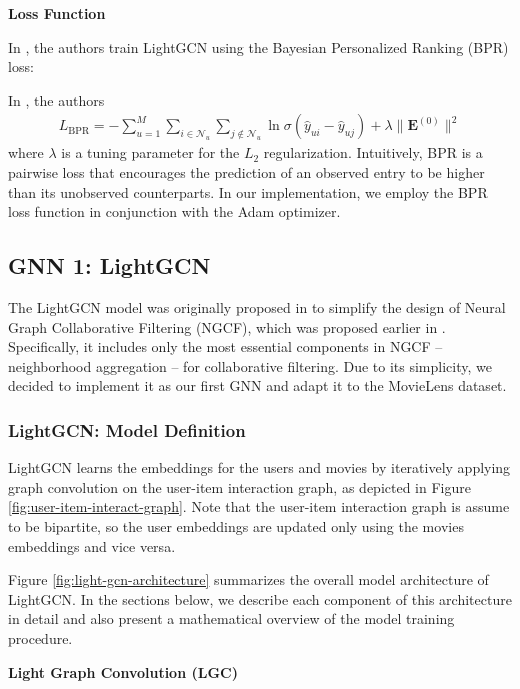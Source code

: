 \documentclass{article}
\begin{document}
\textbf{Loss Function}

In \cite{lightgcn}, the authors train LightGCN using the Bayesian Personalized Ranking (BPR) loss:

In \cite{lightgcn}, the authors 
\begin{align*}
    L_{\mbox{BPR}} = - \sum_{u = 1}^M \sum_{i \in \mathcal{N}_u} \sum_{j \notin \mathcal{N}_u} \ln \sigma(\hat{y}_{ui} - \hat{y}_{uj}) + \lambda \| \mathbf{E}^{(0)} \|^2
\end{align*}
where $\lambda$ is a tuning parameter for the $L_2$ regularization. Intuitively, BPR is a pairwise loss that encourages the prediction of an observed entry to be higher than its unobserved counterparts. In our implementation, we employ the BPR loss function in conjunction with the Adam \cite{adam} optimizer.

\subsection{GNN 1: LightGCN}

The LightGCN model was originally proposed in \cite{lightgcn} to simplify the design of Neural Graph Collaborative Filtering (NGCF), which was proposed earlier in \cite{ngcf}. Specifically, it includes only the most essential components in NGCF -- neighborhood aggregation -- for collaborative filtering. Due to its simplicity, we decided to implement it as our first GNN and adapt it to the MovieLens dataset.

\subsubsection{LightGCN: Model Definition}

LightGCN learns the embeddings for the users and movies by iteratively applying graph convolution on the user-item interaction graph, as depicted in Figure \ref{fig:user-item-interact-graph}. Note that the user-item interaction graph is assume to be bipartite, so the user embeddings are updated only using the movies embeddings and vice versa.

Figure \ref{fig:light-gcn-architecture} summarizes the overall model architecture of LightGCN. In the sections below, we describe each component of this architecture in detail and also present a mathematical overview of the model training procedure.

\textbf{Light Graph Convolution (LGC)}
\end{document}
